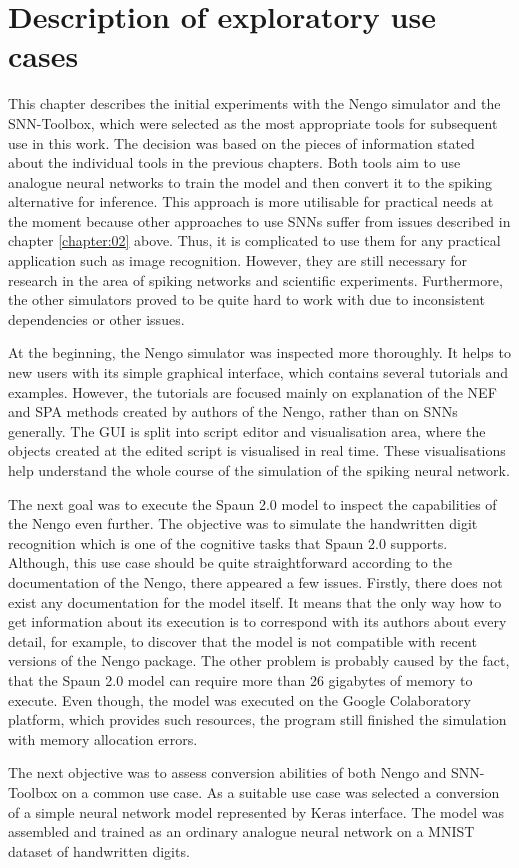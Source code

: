 \chapter{Description of exploratory use cases} \label{chapter:05}

This chapter describes the initial experiments with the Nengo simulator and the SNN-Toolbox, which were selected as the most appropriate tools for subsequent use in this work. The decision was based on the pieces of information stated about the individual tools in the previous chapters. Both tools aim to use analogue neural networks to train the model and then convert it to the spiking alternative for inference. This approach is more utilisable for practical needs at the moment because other approaches to use SNNs suffer from issues described in chapter \ref{chapter:02} above. Thus, it is complicated to use them for any practical application such as image recognition. However, they are still necessary for research in the area of spiking networks and scientific experiments. Furthermore, the other simulators proved to be quite hard to work with due to inconsistent dependencies or other issues. \par
At the beginning, the Nengo simulator was inspected more thoroughly. It helps to new users with its simple graphical interface, which contains several tutorials and examples. However, the tutorials are focused mainly on explanation of the NEF and SPA methods created by authors of the Nengo, rather than on SNNs generally. The GUI is split into script editor and visualisation area, where the objects created at the edited script is visualised in real time. These visualisations help understand the whole course of the simulation of the spiking neural network. \par
The next goal was to execute the Spaun 2.0 model to inspect the capabilities of the Nengo even further. The objective was to simulate the handwritten digit recognition which is one of the cognitive tasks that Spaun 2.0 supports. Although, this use case should be quite straightforward according to the documentation of the Nengo, there appeared a few issues. Firstly, there does not exist any documentation for the model itself. It means that the only way how to get information about its execution is to correspond with its authors about every detail, for example, to discover that the model is not compatible with recent versions of the Nengo package. The other problem is probably caused by the fact, that the Spaun 2.0 model can require more than 26 gigabytes of memory to execute. Even though, the model was executed on the Google Colaboratory platform, which provides such resources, the program still finished the simulation with memory allocation errors. \par
The next objective was to assess conversion abilities of both Nengo and SNN-Toolbox on a common use case. As a suitable use case was selected a conversion of a simple neural network model represented by Keras interface. The model was assembled and trained as an ordinary analogue neural network on a MNIST dataset of handwritten digits.